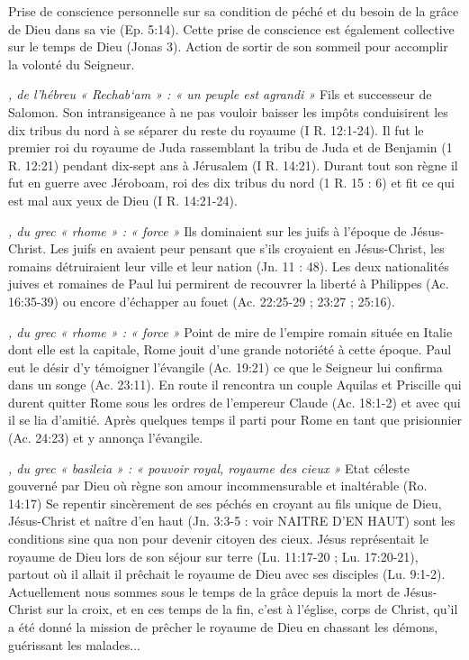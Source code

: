 \begin{multicols}{2}
\textit{}\newline
Prise de conscience personnelle sur sa condition de péché et du besoin de la grâce de Dieu dans sa vie (Ep. 5:14). Cette prise de conscience est également collective sur le temps de Dieu (Jonas 3). Action de sortir de son sommeil pour accomplir la volonté du Seigneur.

\textit{, de l'hébreu « Rechab`am » : « un peuple est agrandi »}\newline
Fils et successeur de Salomon. Son intransigeance à ne pas vouloir baisser les impôts conduisirent les dix tribus du nord à se séparer du reste du royaume (I R. 12:1-24). Il fut le premier roi du royaume de Juda rassemblant la tribu de Juda et de Benjamin (1 R. 12:21) pendant dix-sept ans à Jérusalem (I R. 14:21). Durant tout son règne il fut en guerre avec Jéroboam, roi des dix tribus du nord (1 R. 15 : 6) et fit ce qui est mal aux yeux de Dieu (I R. 14:21-24).

\textit{, du grec « rhome » : « force »}\newline
Ils dominaient sur les juifs à l'époque de Jésus-Christ. Les juifs en avaient peur pensant que s'ils croyaient en Jésus-Christ, les romains détruiraient leur ville et leur nation (Jn. 11 : 48). Les deux nationalités juives et romaines de Paul lui permirent de recouvrer la liberté à Philippes (Ac. 16:35-39) ou encore d'échapper au fouet (Ac. 22:25-29 ; 23:27 ; 25:16).


\textit{, du grec « rhome » : « force »}\newline
Point de mire de l'empire romain située en Italie dont elle est la capitale, Rome jouit d'une grande notoriété à cette époque. Paul eut le désir d'y témoigner l'évangile (Ac. 19:21) ce que le Seigneur lui confirma dans un songe (Ac. 23:11). En route il rencontra un couple Aquilas et Priscille qui durent quitter Rome sous les ordres de l'empereur Claude (Ac. 18:1-2) et avec qui il se lia d'amitié. Après quelques temps il parti pour Rome en tant que prisionnier (Ac. 24:23) et y annonça l'évangile.


\textit{, du grec « basileia » : « pouvoir royal, royaume des cieux »}\newline
Etat céleste gouverné par Dieu où règne son amour incommensurable et inaltérable (Ro. 14:17) Se repentir sincèrement de ses péchés en croyant au fils unique de Dieu, Jésus-Christ et naître d'en haut (Jn. 3:3-5 : voir NAITRE D'EN HAUT) sont les conditions sine qua non pour devenir citoyen des cieux. Jésus représentait le royaume de Dieu lors de son séjour sur terre (Lu. 11:17-20 ; Lu. 17:20-21), partout où il allait il prêchait le royaume de Dieu avec ses disciples (Lu. 9:1-2). Actuellement nous sommes sous le temps de la grâce depuis la mort de Jésus-Christ sur la croix, et en ces temps de la fin, c'est à l'église, corps de Christ, qu'il a été donné la mission de prêcher le royaume de Dieu en chassant les démons, guérissant les malades...


\end{multicols}
